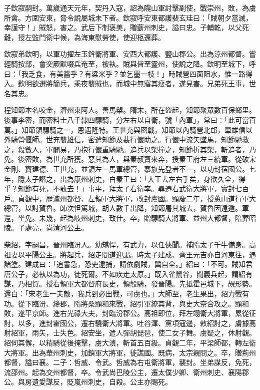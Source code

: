 \begin{pinyinscope}
 子欽寂嗣封。萬歲通天元年，契丹入寇，詔為隴山軍討擊副使，戰崇州，敗，為虜所禽。方圍安東，脅令說屬城未下者。欽寂呼安東都護裴玄珪曰：「賊朝夕當滅，幸謹守！」賊怒，害之。武后下制褒美，贈蘄州刺史，謚曰忠。子輔乾，以父死難，授左監門衛中候，為海東慰勞使，使迎柩還葬。



 欽寂弟欽明，以軍功擢左玉鈐衛將軍、安西大都護、鹽山郡公。出為涼州都督。嘗輕騎按部，會突厥默啜兵奄至，被執。賊與皆至靈州，使說之降。欽明至城下，呼曰：「我乏食，有美醬乎？有粱米乎？並乞墨一枝！」時賊營四面阻水，惟一路得入。欽明欲選將簡兵，乘夜襲賊也，而城中無寤其瘦者，遂見害。兄弟死王事，世名其忠。



 程知節本名咬金，濟州東阿人。善馬槊。隋末，所在盜起，知節聚眾數百保鄉里。後事李密，而密料士八千隸四驃騎，分左右以自衛，號「內軍」，常曰：「此可當百萬。」知節領驃騎之一，恩遇隆特。王世充與密戰，知節以內騎營北邙，單雄信以外騎營偃師。世充襲雄信，密遣知節及裴行儼助之。行儼中流矢墜馬，知節馳救之，殺數人，軍闢易，乃抱行儼重騎馳。追兵以槊撞之，知節折其槊，斬追者，乃免。後密敗，為世充所獲。惡其為人，與秦叔寶來奔，授秦王府左三統軍。從破宋金剛、竇建德、王世充，並領左一馬軍總管，搴旗先登者不一，以功封宿國公。七年，隱太子譖之，出為康州刺史，白秦王曰：「大王去左右手矣，身欲久全，得乎？知節有死，不敢去！」事平，拜太子右衛率。尋遷右武衛大將軍，實封七百戶。貞觀中，歷瀘州都督、左領軍大將軍，改封盧國。顯慶二年，授蔥山道行軍大總管，以討賀魯。師次怛篤城，胡人數千出降，知節屠其城去，賀魯因遠遁。軍還，坐免。未幾，起為岐州刺史，致仕。卒，贈驃騎大將軍、益州大都督，陪葬昭陵。子處亮，尚清河公主。



 柴紹，字嗣昌，晉州臨汾人。幼矯悍，有武力，以任俠聞。補隋太子千牛備身。高祖妻以平陽公主。將起兵，紹走間道迎謁。時太子建成、齊王元吉亦自河東往，遇諸塗。建成曰：「追書急，恐吏逮捕，請依劇賊，冀自全。」紹曰：「不可。賊知君唐公子，必執以為功，徒死爾。不如疾走太原。」既入雀鼠谷，聞義兵起，謂紹有謀，乃相賀。授右領軍大都督府長史，領彀騎，發晉陽。先抵霍邑城下，覘形勢。還白：「宋老生一夫敵，我兵到必出戰，可虜也。」大師至，老生果出，紹力戰有功。從下臨汾、絳郡，隋將桑顯和來戰，紹引軍繚其背，與史大奈合攻之。顯和敗，遂平京師。進右光祿大夫，封臨汾郡公。高祖即位，拜左翊衛大將軍，累從征討，以多，進封霍國公，遷右驍衛大將軍。吐谷渾、黨項寇邊，敕紹討之，虜據高射紹軍，雨矢，士失色。紹安坐，遣人彈胡琵琶，使二女子舞。虜疑之，休射觀。紹伺其懈，以精騎從後掩擊，虜大潰，斬首五百級。貞觀二年，平梁師都，轉左衛大將軍。出為華州刺史，加鎮軍大將軍，徙譙國。既病，太宗親問之。卒，贈荊州都督，謚曰襄。二子：哲威、令武。哲威為右屯衛將軍，襲封。坐弟謀反，免死，流邵州。起為交州都督，卒。令武尚巴陵公主，遷太僕少卿、衛州刺史、襄陽郡公。與房遺愛謀反，貶嵐州刺史，自殺。公主亦賜死。




\end{pinyinscope}
